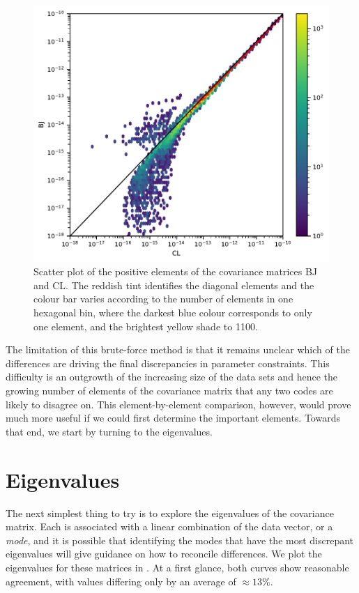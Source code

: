 \documentclass[twocolumn]{\docclass}
\newcommand\scott[1]{{\bf [Scott: #1]}}
\begin{document}
	\begin{figure}
		\includegraphics[width=0.9\columnwidth]{One-to-one-Y1_CL-BJ.pdf}
		\caption{Scatter plot of the positive elements of the covariance matrices BJ and CL. The reddish tint identifies the diagonal elements and the colour bar varies according to the number of elements in one hexagonal bin, where the darkest blue colour corresponds to only one element, and the brightest yellow shade to 1100.
			\label{fig:one-to-one}}
	\end{figure}
	
	The limitation of this brute-force method is that it remains unclear which of the differences are driving the final discrepancies in parameter constraints. This difficulty is an outgrowth of the increasing size of the data sets and hence the growing number of elements of the covariance matrix that any two codes are likely to disagree on. This element-by-element comparison, however, would prove much more useful if we could first determine the important elements. Towards that end, we start by turning to the eigenvalues.
	
	\section{Eigenvalues}
	
	The next simplest thing to try is to explore the eigenvalues of the covariance matrix. Each is associated with a linear combination of the data vector, or a \emph{mode}, and it is possible that identifying the modes that have the most discrepant eigenvalues will give guidance on how to reconcile differences.  We plot the eigenvalues for these matrices in . At a first glance, both curves show reasonable agreement, with values differing only by an average of $\approx 13\%$.
	
\end{document}
